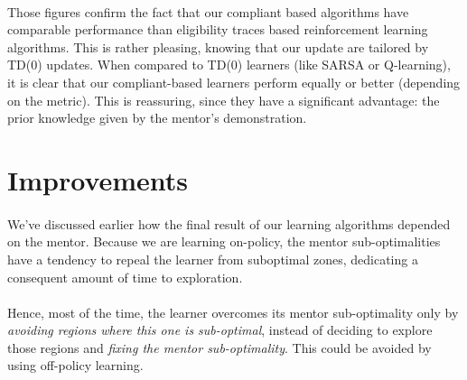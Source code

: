 \documentclass[a4paper]{report}
\begin{document}
{{{			\paragraph{} Those figures confirm the fact that our compliant based algorithms have comparable performance than eligibility traces based reinforcement learning algorithms. This is rather pleasing, knowing that our update are tailored by TD(0) updates. When compared to TD(0) learners (like SARSA or Q-learning), it is clear that our compliant-based learners perform equally or better (depending on the metric). This is reassuring, since they have a significant advantage: the prior knowledge given by the mentor's demonstration. 
		}
		
		\section{Improvements}
		{
			\paragraph{} We've discussed earlier how the final result of our learning algorithms depended on the mentor. Because we are  learning on-policy, the mentor sub-optimalities have a tendency to repeal the learner from suboptimal zones, dedicating a consequent amount of time to exploration. 
			
			\paragraph{} Hence, most of the time, the learner overcomes its mentor sub-optimality only by \emph{avoiding regions where this one is sub-optimal}, instead of deciding to explore those regions and \emph{fixing the mentor sub-optimality}. This could be avoided by using off-policy learning. 
			
}}}
\end{document}
